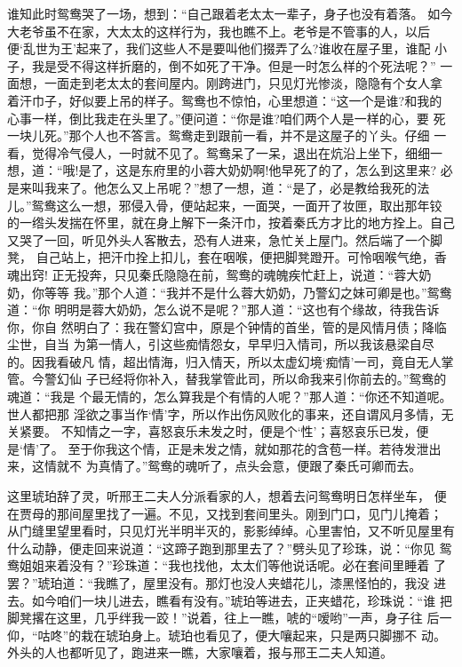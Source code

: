 谁知此时鸳鸯哭了一场，想到：“自己跟着老太太一辈子，身子也没有着落。
如今大老爷虽不在家，大太太的这样行为，我也瞧不上。老爷是不管事的人，以后
便‘乱世为王’起来了，我们这些人不是要叫他们掇弄了么?谁收在屋子里，谁配
小子，我是受不得这样折磨的，倒不如死了干净。但是一时怎么样的个死法呢？”
一面想，一面走到老太太的套间屋内。刚跨进门，只见灯光惨淡，隐隐有个女人拿
着汗巾子，好似要上吊的样子。鸳鸯也不惊怕，心里想道：“这一个是谁?和我的
心事一样，倒比我走在头里了。”便问道：“你是谁?咱们两个人是一样的心，要
死一块儿死。”那个人也不答言。鸳鸯走到跟前一看，并不是这屋子的丫头。仔细
一看，觉得冷气侵人，一时就不见了。鸳鸯呆了一呆，退出在炕沿上坐下，细细一
想，道：“哦!是了，这是东府里的小蓉大奶奶啊!他早死了的了，怎么到这里来?
必是来叫我来了。他怎么又上吊呢？”想了一想，道：“是了，必是教给我死的法
儿。”鸳鸯这么一想，邪侵入骨，便站起来，一面哭，一面开了妆匣，取出那年铰
的一绺头发揣在怀里，就在身上解下一条汗巾，按着秦氏方才比的地方拴上。自己
又哭了一回，听见外头人客散去，恐有人进来，急忙关上屋门。然后端了一个脚凳，
自己站上，把汗巾拴上扣儿，套在咽喉，便把脚凳蹬开。可怜咽喉气绝，香魂出窍!
正无投奔，只见秦氏隐隐在前，鸳鸯的魂魄疾忙赶上，说道：“蓉大奶奶，你等等
我。”那个人道：“我并不是什么蓉大奶奶，乃警幻之妹可卿是也。”鸳鸯道：“你
明明是蓉大奶奶，怎么说不是呢？”那人道：“这也有个缘故，待我告诉你，你自
然明白了：我在警幻宫中，原是个钟情的首坐，管的是风情月债；降临尘世，自当
为第一情人，引这些痴情怨女，早早归入情司，所以我该悬梁自尽的。因我看破凡
情，超出情海，归入情天，所以太虚幻境‘痴情’一司，竟自无人掌管。今警幻仙
子已经将你补入，替我掌管此司，所以命我来引你前去的。”鸳鸯的魂道：“我是
个最无情的，怎么算我是个有情的人呢？”那人道：“你还不知道呢。世人都把那
淫欲之事当作‘情’字，所以作出伤风败化的事来，还自谓风月多情，无关紧要。
不知情之一字，喜怒哀乐未发之时，便是个‘性’；喜怒哀乐已发，便是‘情’了。
至于你我这个情，正是未发之情，就如那花的含苞一样。若待发泄出来，这情就不
为真情了。”鸳鸯的魂听了，点头会意，便跟了秦氏可卿而去。

这里琥珀辞了灵，听邢王二夫人分派看家的人，想着去问鸳鸯明日怎样坐车，
便在贾母的那间屋里找了一遍。不见，又找到套间里头。刚到门口，见门儿掩着；
从门缝里望里看时，只见灯光半明半灭的，影影绰绰。心里害怕，又不听见屋里有
什么动静，便走回来说道：“这蹄子跑到那里去了？”劈头见了珍珠，说：“你见
鸳鸯姐姐来着没有？”珍珠道：“我也找他，太太们等他说话呢。必在套间里睡着
了罢？”琥珀道：“我瞧了，屋里没有。那灯也没人夹蜡花儿，漆黑怪怕的，我没
进去。如今咱们一块儿进去，瞧看有没有。”琥珀等进去，正夹蜡花，珍珠说：“谁
把脚凳撂在这里，几乎绊我一跤！”说着，往上一瞧，唬的“嗳哟”一声，身子往
后一仰，“咕咚”的栽在琥珀身上。琥珀也看见了，便大嚷起来，只是两只脚挪不
动。外头的人也都听见了，跑进来一瞧，大家嚷着，报与邢王二夫人知道。

